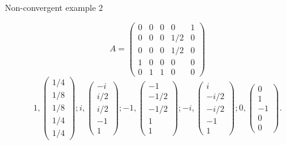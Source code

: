 \documentclass[10pt]{beamer}
\begin{document}
\begin{frame}[allowframebreaks]{Non-convergent example 2}
  \begin{center}
  \end{center}
  \[
    A =
    \begin{pmatrix}
      0 & 0 & 0 &   0 & 1\\
      0 & 0 & 0 & 1/2 & 0\\
      0 & 0 & 0 & 1/2 & 0\\
      1 & 0 & 0 & 0   & 0\\
      0 & 1 & 1 & 0   & 0
    \end{pmatrix}
  \]
  \[
    1,
    \begin{pmatrix}1/4\\1/8\\1/8\\1/4\\1/4
    \end{pmatrix};
    i,
    \begin{pmatrix}-i\\i/2\\i/2\\-1\\1
    \end{pmatrix};
    -1,
    \begin{pmatrix}-1\\-1/2\\-1/2\\1\\1
    \end{pmatrix};
    -i,
    \begin{pmatrix}i\\-i/2\\-i/2\\-1\\1
    \end{pmatrix};
    0,
    \begin{pmatrix}0\\1\\-1\\0\\0
    \end{pmatrix}.
  \]
  \framebreak


\end{frame}
\end{document}
